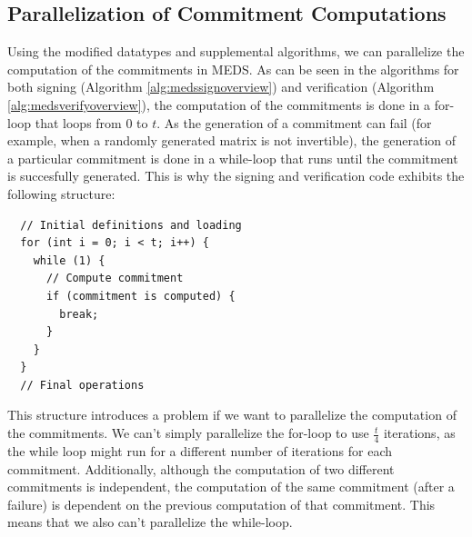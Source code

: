 \documentclass[11pt,a4paper]{report}
\theoremstyle{definition}
\begin{document}
\subsection{Parallelization of Commitment Computations}
\label{sec:commitmentparallelization}
Using the modified datatypes and supplemental algorithms, we can parallelize the computation of the commitments in MEDS. As can be seen in the algorithms for both signing (Algorithm \ref{alg:medssignoverview}) and verification (Algorithm \ref{alg:medsverifyoverview}), the computation of the commitments is done in a for-loop that loops from $0$ to $t$. As the generation of a commitment can fail (for example, when a randomly generated matrix is not invertible), the generation of a particular commitment is done in a while-loop that runs until the commitment is succesfully generated. This is why the signing and verification code exhibits the following structure:
\begin{verbatim}
  // Initial definitions and loading
  for (int i = 0; i < t; i++) {
    while (1) {
      // Compute commitment
      if (commitment is computed) {
        break;
      }
    }
  }
  // Final operations
\end{verbatim}
This structure introduces a problem if we want to parallelize the computation of the commitments. We can't simply parallelize the for-loop to use $\frac{t}{4}$ iterations, as the while loop might run for a different number of iterations for each commitment. Additionally, although the computation of two different commitments is independent, the computation of the same commitment (after a failure) is dependent on the previous computation of that commitment. This means that we also can't parallelize the while-loop.
\end{document}
